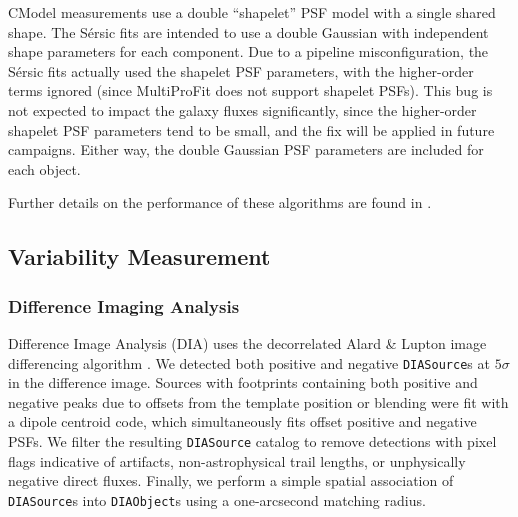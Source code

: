 CModel measurements use a double ``shapelet'' \citep{2003ARA&A..41..645R} PSF model with a single shared shape.
The S\'ersic fits are intended to use a double Gaussian with independent shape parameters for each component.
Due to a pipeline misconfiguration, the S\'ersic fits actually used the shapelet PSF parameters, with the higher-order terms ignored (since MultiProFit does not support shapelet PSFs).
This bug is not expected to impact the galaxy fluxes significantly, since the higher-order shapelet PSF parameters tend to be small, and the fix will be applied in future campaigns.
Either way, the double Gaussian PSF parameters are included for each object.

Further details on the performance of these algorithms are found in .

\subsection{Variability Measurement}
\subsubsection{Difference Imaging Analysis}
\label{ssec:diffim_analysis}
Difference Image Analysis (DIA) uses the decorrelated Alard \& Lupton image differencing algorithm \citep{DMTN-021}.
We detected both positive and negative \texttt{DIASource}s at $5\sigma$ in the difference image.
Sources with footprints containing both positive and negative peaks due to offsets from the template position or blending were fit with a dipole centroid code, which simultaneously fits offset positive and negative PSFs.
We filter the resulting \texttt{DIASource} catalog to remove detections with pixel flags indicative of artifacts, non-astrophysical trail lengths, or unphysically negative direct fluxes.
Finally, we perform a simple spatial association of \texttt{DIASource}s into \texttt{DIAObject}s using a one-arcsecond matching radius.

